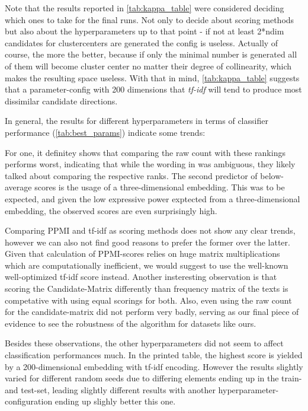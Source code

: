 Note that the results reported in \autoref{tab:kappa_table} were considered \wrt deciding which ones to take for the final runs. Not only to decide about scoring methods but also about the hyperparameters up to that point - if not at least 2*ndim candidates for clustercenters are generated the config is useless. Actually of course, the more the better, because if only the minimal number is generated all of them will become cluster center no matter their degree of collinearity, which makes the resulting space useless. With that in mind, \autoref{tab:kappa_table} suggests that a parameter-config with 200 dimensions that \textit{tf-idf} will tend to produce most dissimilar candidate directions.

In general, the results for different hyperparameters in terms of classifier performance (\autoref{tab:best_params}) indicate some trends:

For one, it definitey shows that comparing the raw count with these rankings performs worst, indicating that while the wording in  was ambiguous, they likely talked about comparing the respective ranks. The second predictor of below-average scores is the usage of a three-dimensional embedding. This was to be expected, and given the low expressive power exptected from a three-dimensional embedding, the observed scores are even surprisingly high.

Comparing PPMI and tf-idf as scoring methods does not show any clear trends, however we can also not find good reasons to prefer the former over the latter. Given that calculation of PPMI-scores relies on huge matrix multiplications which are computationally inefficient, we would suggest to use the well-known well-optimized tf-idf score instead. Another insteresting observation is that scoring the Candidate-Matrix differently than frequency matrix of the texts is competative with using equal scorings for both. Also, even using the raw count for the candidate-matrix did not perform very badly, serving as our final piece of evidence to see the robustness of the algorithm for datasets like ours.

Besides these observations, the other hyperparameters did not seem to affect classification performances much. In the printed table, the highest score is yielded by a 200-dimensional embedding with tf-idf encoding. However the results slightly varied for different random seeds due to differing elements ending up in the train- and test-set, leading slightly different results with another hyperparameter-configuration ending up slighly better this one.

